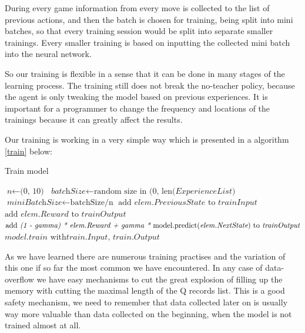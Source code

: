 \documentclass[]{article}
\begin{document}
\par During every game information from every move is collected to the list of previous actions, and then the batch is chosen for training, being split into mini batches, so that every training session would be split into separate smaller trainings. Every smaller training is based on inputting the collected mini batch into the neural network. 

\par So our training is flexible in a sense that it can be done in many stages of the learning process. The training still does not break the no-teacher policy, because the agent is only tweaking the model based on previous experiences. It is important for a programmer to change the frequency and locations of the trainings because it can greatly affect the results. 

\newpage

\par Our training is working in a very simple way which is presented in a algorithm \ref{train} below:

\begin{algorithm}
	\caption{Train model}\label{train}
	\begin{algorithmic}
		\State  $\textit{n} \gets \text{(0, 10)}$
		\State $\textit{batchSize} \gets \text{random size in (0, len(} \textit{ExperienceList} \text{)}$	
		\State $\textit{miniBatchSize} \gets \text{batchSize/n}$
		\State $\text{add }\textit{elem.PreviousState} \text{ to } \textit{trainInput}$
		\State $\text{add }\textit{elem.Reward} \text{ to } \textit{trainOutput}$
		\Else
		\State $\text{add } \textit{(1 - gamma) * elem.Reward + gamma *} \newline \text{ model.predict(} \textit{elem.NextState} \text{) to } \textit{trainOutput}$
		\EndIf
		\EndFor
		\EndFor
		\State $\textit{model.train} \text{ with} \textit{train.Input, train.Output}$
		\EndProcedure
	\end{algorithmic}
\end{algorithm}
 
\par As we have learned there are numerous training practises and the variation of this one if so far the most common we have encountered. In any case of data-overflow we have easy mechanisms to cut the great explosion of filling up the memory with cutting the maximal length of the Q records list. This is a good safety mechanism, we need to remember that data collected later on is usually way more valuable than data collected on the beginning, when the model is not trained almost at all.
\end{document}
